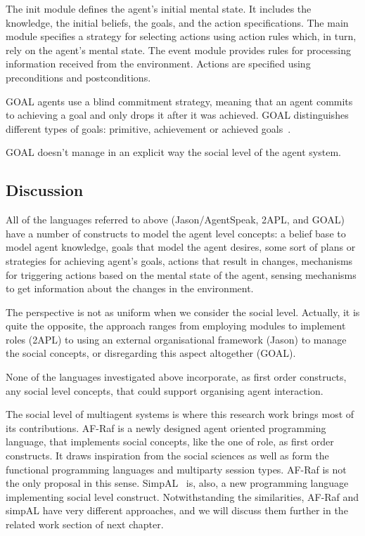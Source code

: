 \documentclass[a4paper,12pt,oneside,fleqn]{book} %
\begin{document}
The init module defines the agent's initial mental state. It includes the
knowledge, the initial beliefs, the goals, and the action specifications.
The main module specifies a strategy for selecting actions using action
rules which, in turn, rely on the agent's mental state. The event module
provides rules for processing information received from the environment.
Actions are specified using preconditions and postconditions.

GOAL agents use a blind commitment strategy, meaning that an agent commits
to achieving a goal and only drops it after it was achieved. GOAL
distinguishes different types of goals: primitive, achievement or achieved
goals~\cite{DBLP:conf/jelia/indriksH08}.

GOAL doesn't manage in an explicit way the social level of the agent system.

\subsection{Discussion} %

All of the languages referred to above (Jason/AgentSpeak, 2APL, and GOAL)
have a number of constructs to model the agent level concepts: a belief
base to model agent knowledge, goals that model the agent desires, some
sort of plans or strategies for achieving agent's goals, actions that
result in changes, mechanisms for triggering actions based on the mental
state of the agent, sensing mechanisms to get information about the changes
in the environment.

The perspective is not as uniform when we consider the social level.
Actually, it is quite the opposite, the approach ranges from employing
modules to implement roles (2APL) to using an external organisational framework
(Jason) to manage the social concepts, or disregarding this aspect
altogether (GOAL).

None of the languages investigated above incorporate, as first order
constructs, any social level concepts, that could support organising agent
interaction.

The social level of multiagent systems is where this research
work brings most of its contributions. AF-Raf is a newly designed
agent oriented programming language, that implements social
concepts, like the one of role, as first order constructs. It draws
inspiration from the social sciences as well as form the functional
programming languages and multiparty session types. AF-Raf is not the only
proposal in this sense. SimpAL~\cite{DBLP:conf/oopsla/RicciS11} is, also, a new programming language
implementing social level construct. Notwithstanding the similarities,
AF-Raf and simpAL have very different approaches, and we will discuss them
further in the related work section of next chapter.
\end{document}
